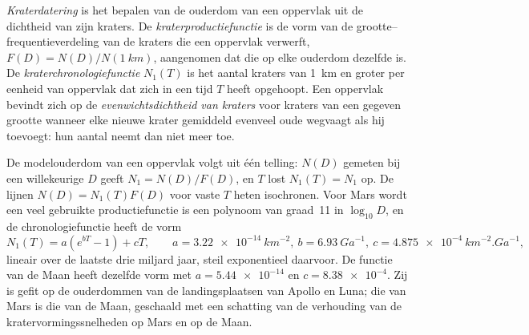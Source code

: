 \begin{definition}\label{def:b3:planetary-interiors-surfaces:crater-dating}
\emph{Kraterdatering} is het bepalen van de ouderdom
van een oppervlak uit de dichtheid van zijn kraters. De
\emph{kraterproductiefunctie} is de vorm van de
grootte--frequentieverdeling van de kraters die een oppervlak verwerft, $F(D) =
N(D)/N(\qty{1}{km})$, aangenomen dat die op elke ouderdom dezelfde is. De
\emph{kraterchronologiefunctie} $N_1(T)$ is het
aantal kraters van \qty{1}{km} en groter per eenheid van oppervlak dat zich in een
tijd $T$ heeft opgehoopt. Een oppervlak bevindt zich op de
\emph{evenwichtsdichtheid van kraters} voor kraters van een
gegeven grootte wanneer elke nieuwe krater gemiddeld evenveel oude wegvaagt als hij
toevoegt: hun aantal neemt dan niet meer toe.
\end{definition}

De modelouderdom van een oppervlak volgt uit één telling: $N(D)$ gemeten bij een willekeurige
$D$ geeft $N_1 = N(D)/F(D)$, en $T$ lost $N_1(T) = N_1$ op. De lijnen
$N(D) = N_1(T)F(D)$ voor vaste $T$ heten isochronen. Voor Mars wordt een
veel gebruikte productiefunctie is een polynoom van graad~11 in $\log_{10}D$, en
de chronologiefunctie heeft de vorm
\[
  N_1(T) = a\left(e^{bT} - 1\right) + cT , \qquad
  a = \qty{3.22e-14}{km^{-2}}, \ b = \qty{6.93}{Ga^{-1}}, \
  c = \qty{4.875e-4}{km^{-2}.Ga^{-1}} ,
\]
lineair over de laatste drie miljard jaar, steil exponentieel daarvoor. De
functie van de Maan heeft dezelfde vorm met $a = \num{5.44e-14}$ en $c =
\num{8.38e-4}$. Zij is gefit op de ouderdommen van de landingsplaatsen van Apollo en Luna;
die van Mars is die van de Maan, geschaald met een schatting van de verhouding van de
kratervormingssnelheden op Mars en op de Maan.

